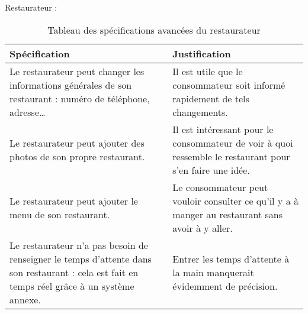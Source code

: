 Restaurateur : \\

\begin{table}[H]
    \centering
    \caption{Tableau des spécifications avancées du restaurateur}
    \label{min-spec-table}
    \begin{tabular}{p{8cm}|p{8cm}}
        \bf{Spécification} & \bf{Justification} \\ \hline
            Le restaurateur peut changer les informations générales de son restaurant : numéro de téléphone, adresse\dots & Il est utile que le consommateur soit informé rapidement de tels changements. \\ \hline
            Le restaurateur peut ajouter des photos de son propre restaurant. & Il est intéressant pour le consommateur de voir à quoi ressemble le restaurant pour s'en faire une idée. \\ \hline
            Le restaurateur peut ajouter le menu de son restaurant. & Le consommateur peut vouloir consulter ce qu'il y a à manger au restaurant sans avoir à y aller. \\ \hline
            Le restaurateur n'a pas besoin de renseigner le temps d'attente dans son restaurant : cela est fait en temps réel grâce à un système annexe. & Entrer les temps d'attente à la main manquerait évidemment de précision. \\
    \end{tabular}
\end{table}